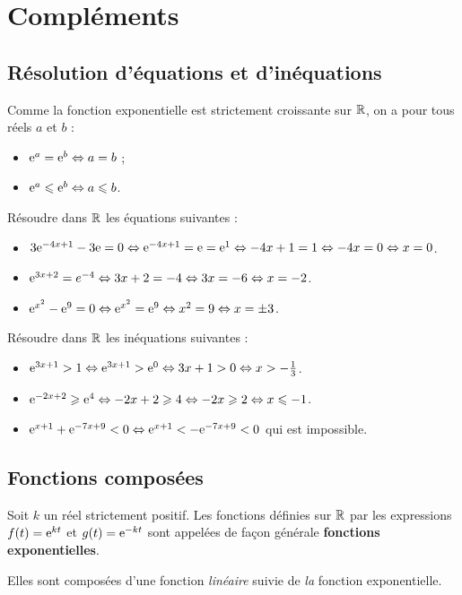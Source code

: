 \documentclass[a4paper,11pt]{article}
\begin{document}
\section{Compléments}

\subsection{Résolution d'équations et d'inéquations}

\begin{cprop}
Comme la fonction exponentielle est strictement croissante sur $\R$, on a pour tous réels $a$ et $b$ :
\begin{itemize}
	\item ${\rm e}^a={\rm e}^b \Leftrightarrow a=b$ ;
	\item ${\rm e}^a \leqslant {\rm e}^b \Leftrightarrow a \leqslant b$.
\end{itemize}
\end{cprop}

\begin{cexemple}
Résoudre dans $\R$ les équations suivantes :
\begin{itemize}[leftmargin=*]
	\item $3{\rm e}^{-4x+1} - 3{\rm e}=0 \Leftrightarrow {\rm e}^{-4x+1}={\rm e}={\rm e}^1 \Leftrightarrow -4x+1=1 \Leftrightarrow -4x=0 \Leftrightarrow x=0$.
	\item ${\rm e}^{3x+2} =e^{-4} \Leftrightarrow 3x+2=-4 \Leftrightarrow 3x=-6 \Leftrightarrow x=-2$.
	\item ${\rm e}^{x^2}-{\rm e}^{9} =0 \Leftrightarrow {\rm e}^{x^2}={\rm e}^9 \Leftrightarrow x^2=9 \Leftrightarrow x=\pm3$. 
\end{itemize}
Résoudre dans $\R$ les inéquations suivantes :
\begin{itemize}[leftmargin=*]
	\item ${\rm e}^{3x+1} >1 \Leftrightarrow {\rm e}^{3x+1} >{\rm e}^0 \Leftrightarrow 3x+1 > 0 \Leftrightarrow x > -\tfrac{1}{3}$. 
	\item ${\rm e}^{-2x+2} \geqslant {\rm e}^{4} \Leftrightarrow -2x+2 \geqslant 4 \Leftrightarrow -2x \geqslant 2 \Leftrightarrow x \leqslant -1$. 
	\item ${\rm e}^{x+1}+{\rm e}^{-7x+9} <0 \Leftrightarrow {\rm e}^{x+1} < -{\rm e}^{-7x+9} <0$ qui est impossible. 
\end{itemize}
\end{cexemple}

\subsection{Fonctions composées}

\begin{cdefi}
Soit $k$ un réel strictement positif. Les fonctions définies sur $\R$ par les expressions $f(t)={\rm e}^{kt}$ et $g(t)={\rm e}^{-kt}$ sont appelées de façon générale \textbf{fonctions exponentielles}.

Elles sont composées d'une fonction \textit{linéaire} suivie de \textit{la} fonction exponentielle.
\end{cdefi}
\end{document}
